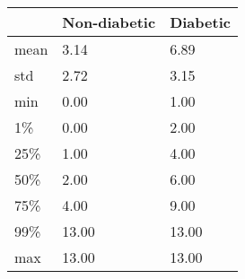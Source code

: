 \begin{tabular}{lll}
\toprule
{} & Non-diabetic & Diabetic \\
\midrule
mean &         3.14 &     6.89 \\
std  &         2.72 &     3.15 \\
min  &         0.00 &     1.00 \\
1\%   &         0.00 &     2.00 \\
25\%  &         1.00 &     4.00 \\
50\%  &         2.00 &     6.00 \\
75\%  &         4.00 &     9.00 \\
99\%  &        13.00 &    13.00 \\
max  &        13.00 &    13.00 \\
\bottomrule
\end{tabular}
